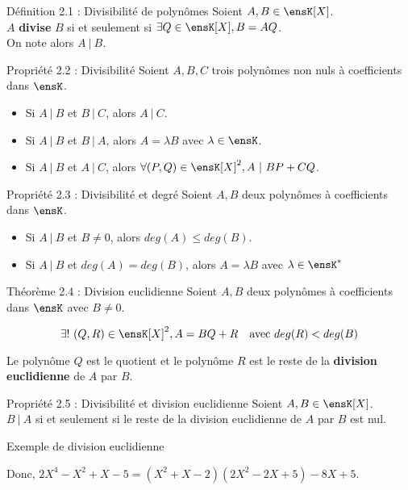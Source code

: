 \begin{theorem}[red]{Définition 2.1 : Divisibilité de  polynômes}
    Soient $A, B \in \ensK[X]$. \\
    $A$ \textbf{divise} $B$ si et seulement si $\exists Q \in \ensK[X], B = AQ$. \\
    On note alors $A \ | \ B$.
\end{theorem}

\begin{theorem}[blue]{Propriété 2.2 : Divisibilité}
    Soient $A, B, C$ trois polynômes non nuls à coefficients dans $\ensK$.

    \begin{itemize}
        \item Si $A \ | \ B$ et $B \ | \ C$, alors $ A \ | \ C$.
        \item Si $A \ | \ B$ et $B \ | \ A$, alors $A = \lambda B$ avec $\lambda \in \ensK$.
        \item Si $A \ | \ B$ et $A \ | \ C$, alors $\forall (P, Q) \in \ensK[X]^2, A \ | \ BP + CQ$.
    \end{itemize}
\end{theorem}

\begin{theorem}[blue]{Propriété 2.3 : Divisibilité et degré}
    Soient $A, B$ deux polynômes à coefficients dans $\ensK$.

    \begin{itemize}
        \item Si $A \ | \ B$ et $B \neq 0$, alors $deg(A) \leq deg(B)$.
        \item Si $A \ | \ B$ et $deg(A) = deg(B)$, alors $A = \lambda B$ avec $\lambda \in \ensK^*$
    \end{itemize}
\end{theorem}

\begin{theorem}[orange]{Théorème 2.4 : Division euclidienne}
    Soient $A, B$ deux polynômes à coefficients dans $\ensK$ avec $B \neq 0$.

    $$
        \exists ! \ (Q, R) \in \ensK[X]^2, A = BQ + R \hspace{10px} \text{avec } deg(R) < deg(B)
    $$

    \noindent Le polynôme $Q$ est le quotient et le polynôme $R$ est le reste de la \textbf{division euclidienne} de $A$ par $B$.
\end{theorem}

\begin{theorem}[blue]{Propriété 2.5 : Divisibilité et division euclidienne}
    Soient $A, B \in \ensK[X]$. \\
    $B \ | \ A$ si et seulement si le reste de la division euclidienne de $A$ par $B$ est nul.
\end{theorem}

\begin{theorem}[black]{Exemple de division euclidienne}
    \begin{center}
    \end{center}

    \vspace{5px}

    \noindent Donc, $2X^4 - X^2 + X - 5 = (X^2 + X - 2)(2X^2 - 2X + 5) - 8X + 5$.
\end{theorem}